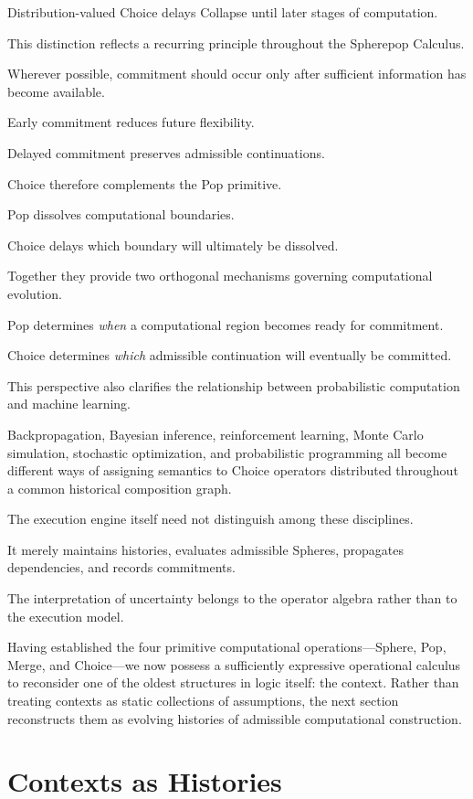 \documentclass[12pt,oneside]{article}
\theoremstyle{definition}
\theoremstyle{remark}
\begin{document}
Distribution-valued Choice delays Collapse until later stages of computation.

This distinction reflects a recurring principle throughout the Spherepop
Calculus.

Wherever possible, commitment should occur only after sufficient information
has become available.

Early commitment reduces future flexibility.

Delayed commitment preserves admissible continuations.

Choice therefore complements the Pop primitive.

Pop dissolves computational boundaries.

Choice delays which boundary will ultimately be dissolved.

Together they provide two orthogonal mechanisms governing computational
evolution.

Pop determines \emph{when} a computational region becomes ready for
commitment.

Choice determines \emph{which} admissible continuation will eventually be
committed.

This perspective also clarifies the relationship between probabilistic
computation and machine learning.

Backpropagation, Bayesian inference, reinforcement learning, Monte Carlo
simulation, stochastic optimization, and probabilistic programming all become
different ways of assigning semantics to Choice operators distributed
throughout a common historical composition graph.

The execution engine itself need not distinguish among these disciplines.

It merely maintains histories, evaluates admissible Spheres, propagates
dependencies, and records commitments.

The interpretation of uncertainty belongs to the operator algebra rather than
to the execution model.

Having established the four primitive computational operations—Sphere, Pop,
Merge, and Choice—we now possess a sufficiently expressive operational
calculus to reconsider one of the oldest structures in logic itself: the
context. Rather than treating contexts as static collections of assumptions,
the next section reconstructs them as evolving histories of admissible
computational construction.

\section{Contexts as Histories}
\end{document}
